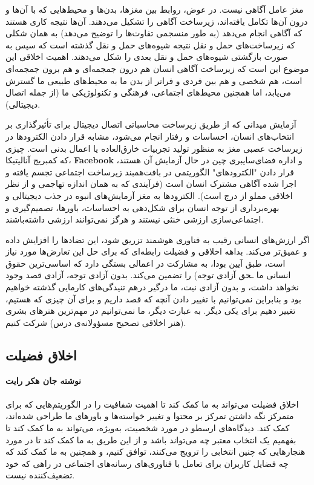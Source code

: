 مغز عامل آگاهی نیست.
در عوض، روابط بین مغزها، بدن‌ها و محیط‌هایی که با آن‌ها و درون آن‌ها تکامل یافته‌اند، زیرساخت آگاهی را تشکیل می‌دهند.
آن‌ها نتیجه کاری هستند که آگاهی انجام می‌دهد (به طور منسجمی تفاوت‌ها را توضیح می‌دهد) به همان شکلی که زیرساخت‌های حمل و نقل نتیجه شیوه‌های حمل و نقل گذشته است که سپس به صورت بازگشتی شیوه‌های حمل و نقل بعدی را شکل می‌دهند.
اهمیت اخلاقی این موضوع این است که زیرساخت آگاهی انسان هم درون جمجمه‌ای و هم برون جمجمه‌ای است، هم شخصی و هم بین فردی و فراتر از بدن ما به محیط‌های طبیعی ما گسترش می‌یابد، اما همچنین محیط‌های اجتماعی، فرهنگی و تکنولوژیکی ما (از جمله اتصال دیجیتالی).

آزمایش میدانی که از طریق زیرساخت محاسباتی اتصال دیجیتال برای تأثیرگذاری بر انتخاب‌های انسان، احساسات و رفتار انجام می‌شود، مشابه قرار دادن الکترودها در زیرساخت عصبی مغز به منظور تولید تجربیات خارق‌العاده یا اعمال بدنی است.
چیزی که کمبریج آنالیتیکا، \textenglish{\textbf{Facebook}} و اداره فضای‌سایبری چین در حال آزمایش آن هستند، قرار دادن "الکترودهای" الگوریتمی در بافت‌همبند زیرساخت اجتماعی تجسم یافته و اجرا شده آگاهی مشترک انسان است (فرآیندی که به همان اندازه تهاجمی و از نظر اخلاقی مملو از درج است).
الکترودها به مغز آزمایش‌های انبوه در جذب دیجیتالی و بهره‌برداری از توجه انسان برای شکل‌دهی به احساسات، باورها، تصمیم‌گیری و اجتماعی‌سازی ارزشی خنثی نیستند و هرگز نمی‌توانند ارزشی داشته‌باشند.

اگر ارزش‌های انسانی رقیب به فناوری هوشمند تزریق شود، این تضادها را افزایش داده و عمیق‌تر می‌کند.
بداهه اخلاقی و فضیلت رابطه‌ای که برای حل این تعارض‌ها مورد نیاز است، طبق آیین بودا، به مشارکت در اعمالی بستگی دارد که اساسی‌ترین حقوق انسانی ما ـحق آزادی توجه) را تضمین می‌کند.
بدون آزادی توجه، آزادی قصد وجود نخواهد داشت، و بدون آزادی نیت، ما درگیر درهم تنیدگی‌های کارمایی گذشته خواهیم بود و بنابراین نمی‌توانیم با تغییر دادن آنچه که قصد داریم و برای آن چیزی که هستیم، تغییر دهیم برای یکی دیگر.
به عبارت دیگر، ما نمی‌توانیم در مهم‌ترین هنرهای بشری (هنر اخلاقی تصحیح مسؤولانه‌ی درس) شرکت کنیم.
\newline
\newline


{
\subsection*{اخلاق فضیلت}
\label{subsec:اخلاق فضیلت}
\noindent \textbf{نوشته جان هکر رایت}
\\\\
اخلاق فضیلت می‌تواند به ما کمک کند تا اهمیت شفافیت را در الگوریتم‌هایی که برای متمرکز نگه داشتن تمرکز بر محتوا و تغییر خواسته‌ها و باورهای ما طراحی شده‌اند، کمک کند.
دیدگاه‌های ارسطو در مورد شخصیت، به‌ویژه، می‌تواند به ما کمک کند تا بفهمیم یک انتخاب معتبر چه می‌تواند باشد و از این طریق به ما کمک کند تا در مورد هنجارهایی که چنین انتخابی را ترویج می‌کنند، توافق کنیم، و همچنین به ما کمک کند که چه فضایل کاربران برای تعامل با فناوری‌های رسانه‌های اجتماعی در راهی که خود تضعیف‌کننده نیست.
}

